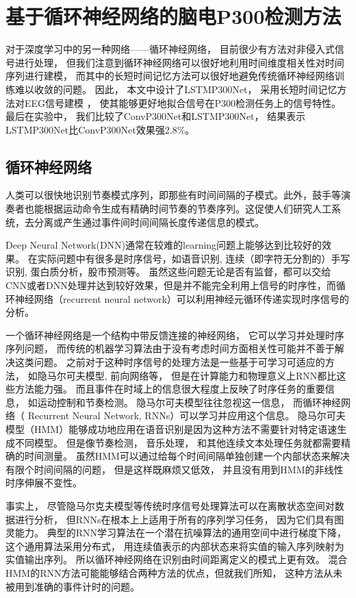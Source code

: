 \chapter{基于循环神经网络的脑电P300检测方法}

对于深度学习中的另一种网络——循环神经网络， 目前很少有方法对非侵入式信号进行处理， 但我们注意到循环神经网络可以很好地利用时间维度相关性对时间序列进行建模， 而其中的长短时间记忆方法可以很好地避免传统循环神经网络训练难以收敛的问题。 因此， 本文中设计了LSTMP300Net， 采用长短时间记忆方法对EEG信号建模 ， 使其能够更好地拟合信号在P300检测任务上的信号特性。 最后在实验中， 我们比较了ConvP300Net和LSTMP300Net， 结果表示LSTMP300Net比ConvP300Net效果强2.8\%。


\section{循环神经网络}

人类可以很快地识别节奏模式序列，即那些有时间间隔的子模式。此外，鼓手等演奏者也能根据运动命令生成有精确时间节奏的节奏序列。这促使人们研究人工系统，去分离或产生通过事件间时间间隔长度传递信息的模式。

Deep Neural Network(DNN)通常在较难的learning问题上能够达到比较好的效果。 在实际问题中有很多是时序信号，如语音识别, 连续（即字符无分割的）手写识别, 蛋白质分析，股市预测等。 虽然这些问题无论是否有监督，都可以交给CNN或者DNN处理并达到较好效果\cite{abdel2014convolutional,lecun1995convolutional,ciresan2011convolutional,lecun1994word,lauer2007trainable,baldi1996hybrid,zhu2014stock}，但是并不能完全利用上信号的时序性，而循环神经网络（recurrent neural network）可以利用神经元循环传递实现时序信号的分析。

一个循环神经网络是一个结构中带反馈连接的神经网络， 它可以学习并处理时序序列问题， 而传统的机器学习算法由于没有考虑时间方面相关性可能并不善于解决这类问题。 之前对于这种时序信号的处理方法是一些基于可学习可适应的方法， 如隐马尔可夫模型\cite{eddy1996hidden}, 前向网络等， 但是在计算能力和物理意义上RNN都比这些方法能力强。 而且事件在时域上的信息很大程度上反映了时序任务的重要信息， 如运动控制和节奏检测。 隐马尔可夫模型往往忽视这一信息， 而循环神经网络（ Recurrent Neural Network, RNNs）可以学习并应用这个信息。 隐马尔可夫模型（HMM）能够成功地应用在语音识别是因为这种方法不需要针对特定语速生成不同模型。 但是像节奏检测， 音乐处理， 和其他连续文本处理任务就都需要精确的时间测量。 虽然HMM可以通过给每个时间间隔单独创建一个内部状态来解决有限个时间间隔的问题， 但是这样既麻烦又低效， 并且没有用到HMM的非线性时序伸展不变性。

事实上， 尽管隐马尔克夫模型等传统时序信号处理算法可以在离散状态空间对数据进行分析， 但RNNs在根本上上适用于所有的序列学习任务， 因为它们具有图灵能力\cite{siegelmann1995computational}。 典型的RNN学习算法在一个潜在抗噪算法的通用空间中进行梯度下降\cite{pearlmutter1995gradient}， 这个通用算法采用分布式， 用连续值表示的内部状态来将实值的输入序列映射为实值输出序列。 所以循环神经网络在识别由时间距离定义的模式上更有效。 混合HMM的RNN方法\cite{bengio1995input}可能能够结合两种方法的优点，但就我们所知， 这种方法从未被用到准确的事件计时的问题。



